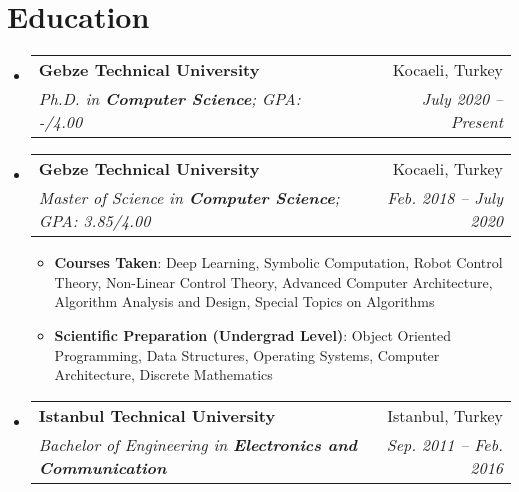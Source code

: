\documentclass[letterpaper,11pt]{article}
\makeatletter
\newcommand{\resumeItem}[2]{
\item\small{
		\textbf{#1}{: #2 \vspace{-2pt}}
	}
}
\newcommand{\resumeSubheading}[4]{
\vspace{-1pt}\item
	\begin{tabular*}{0.97\textwidth}{l@{\extracolsep{\fill}}r}
		\textbf{#1} & #2 \\
		\textit{\small#3} & \textit{\small #4} \\
	\end{tabular*}
}
\newcommand{\resumeSubHeadingListStart}{\begin{itemize}[leftmargin=*]}
\newcommand{\resumeSubHeadingListEnd}{\end{itemize}}
\newcommand{\resumeItemListStart}{\begin{itemize}}
\newcommand{\resumeItemListEnd}{\end{itemize}}
\makeatother
\begin{document}


\section{{Education}}
  \resumeSubHeadingListStart
    \resumeSubheading
      {Gebze Technical University}{Kocaeli, Turkey}
      {Ph.D. in \textbf{Computer Science};  GPA: -/4.00}{July 2020 -- Present}
     \vspace{-10pt}\resumeSubheading
      {Gebze Technical University}{Kocaeli, Turkey}
      {Master of Science in \textbf{Computer Science};  GPA: 3.85/4.00}{Feb. 2018 -- July 2020}
	  \resumeItemListStart\vspace{-5pt}
	\resumeItem{Courses Taken}{Deep Learning, Symbolic Computation, Robot Control Theory,
	Non-Linear Control Theory, Advanced Computer Architecture, Algorithm Analysis and Design,
	Special Topics on Algorithms}
	\resumeItem{Scientific Preparation (Undergrad Level)}{Object Oriented Programming, Data Structures,
		    Operating Systems, Computer Architecture, Discrete Mathematics} 
      \resumeItemListEnd\vspace{-7pt}
    \resumeSubheading
      {Istanbul Technical University}{Istanbul, Turkey}
      {Bachelor of Engineering in \textbf{Electronics and Communication}}{Sep. 2011 -- Feb. 2016}
  \resumeSubHeadingListEnd\vspace{-18pt}
\end{document}
